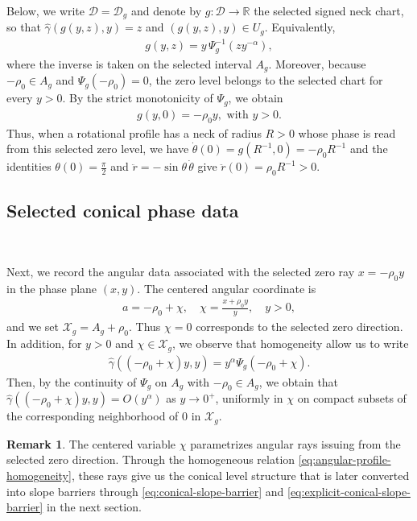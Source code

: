 \documentclass{amsart}
\theoremstyle{plain}
\theoremstyle{mainintrothm}
\theoremstyle{definition}
\newtheorem{remark}[theorem]{Remark}
\begin{document}
	Below, we write $\mathcal D=\mathcal D_g$ and denote by
	$g:\mathcal D\to\mathbb R$ the selected signed neck chart, so that
	$\widehat\gamma(g(y,z),y)=z$ and $(g(y,z),y)\in U_g$.  Equivalently,
	\begin{align*}
		g(y,z)
		=
		y\,\Psi_g^{-1}\left(zy^{-\alpha}\right),
	\end{align*}
	where the inverse is taken on the selected interval $A_g$.  Moreover, because
	$-\rho_0\in A_g$ and $\Psi_g(-\rho_0)=0$, the zero level belongs to the
	selected chart for every $y>0$.  By the strict monotonicity of $\Psi_g$, we obtain
	\begin{align}
		\label{eq:zero-trace-conical}
		g(y,0)
		=
		-\rho_0 y,
		\mbox{ with } 
		y>0.
	\end{align}
	Thus, when a rotational profile has a neck of radius $R>0$ whose phase is read
	from this selected zero level, we have $\dot\theta(0)=g\left(R^{-1},0\right)=-\rho_0R^{-1}$ and 
	the identities $\theta(0)=\frac{\pi}{2}$ and $\ddot r=-\sin\theta\,\dot\theta$ give $\ddot r(0)=\rho_0R^{-1}>0$.


	\subsection{Selected conical phase data}\,
	\label{subsec:selected-conical-phase-data}

	Next, we record the angular data associated with the selected zero ray
	$x=-\rho_0y$ in the phase plane $(x,y)$. The centered angular coordinate is
	\begin{align*}
		a=-\rho_0+\chi,
		\quad
		\chi=\frac{x+\rho_0 y}{y},
		\quad
		y>0,
	\end{align*}
	and we set $\mathcal X_g=A_g+\rho_0$.  Thus $\chi=0$ corresponds to the selected
	zero direction. In addition, for $y>0$ and $\chi\in\mathcal X_g$, we observe that  homogeneity allow us to write
	\begin{align}
		\label{eq:angular-profile-homogeneity}
		\widehat\gamma((-\rho_0+\chi)y,y)
		=
		y^\alpha\Psi_g(-\rho_0+\chi).
	\end{align}
	Then, by the continuity of $\Psi_g$ on $A_g$ with $-\rho_0\in A_g$, we obtain  that $\widehat\gamma((-\rho_0+\chi)y,y)=O(y^\alpha)$ as $y\to0^+$, uniformly in $\chi$ on compact subsets of the corresponding neighborhood
	of $0$ in $\mathcal X_g$.

	\begin{remark}
		\label{rem:conical-decay-not-origin-continuity}
		The centered variable $\chi$ parametrizes angular rays issuing from the
		selected zero direction. Through the homogeneous relation
		\eqref{eq:angular-profile-homogeneity}, these rays give us the conical level
		structure that is later converted into slope barriers through
		\eqref{eq:conical-slope-barrier} and
		\eqref{eq:explicit-conical-slope-barrier} in the next section. 
	\end{remark}
\end{document}
